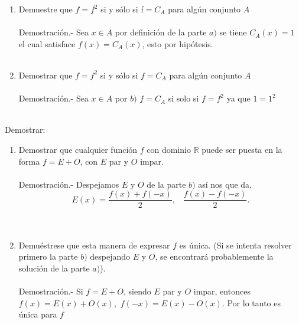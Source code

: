 \begin{teo}
\begin{enumerate}[\bfseries a)]
\item  Demuestre que $f = f^2$ si y sólo si f$ = C_A$ para algún conjunto $A$\\\\
Demostración.- \; Sea $x\in A$ por definición de la parte $a)$ se tiene $C_A(x)=1$ el cual satisface $f(x)=C_A(x)$, esto por hipótesis.\\\\

\item Demostrar que $f=f^2$ si y sólo si $f=C_A$ para algún conjunto $A$\\\\
Demostración.- \; Sea $x \in A$ por $b)$ $f=C_A$ si solo si $f=f^2$ ya que $1=1^2$\\\\
\end{enumerate}
\end{teo}

\begin{teo} Demostrar:
\begin{enumerate}[\bfseries a)]
\item Demostrar que cualquier función $f$ con dominio $\mathbb{R}$ puede ser puesta en la forma $f=E+O$, con $E$ par y $O$ impar.\\\\
Demostración.- \;  Despejamos $E$ y $O$ de la parte $b)$ así nos que da, $$E(x)=\dfrac{f(x) + f(-x)}{2}, \; \; \; \dfrac{f(x)-f(-x)}{2}.$$\\\\
\item Demuéstrese que esta manera de expresar $f$ es única. (Si se intenta resolver primero la parte $b)$ despejando $E$ \; y \; $O$, se encontrará probablemente la solución de la parte $a)$).\\\\
Demostración.- \; Si $f=E+O$, siendo $E$ par y $O$ impar, entonces $f(x)=E(x)+O(x),$ $f(-x)=E(x) - O(x)$. Por lo tanto es única para $f$\\\\
\end{enumerate}
\end{teo} 

